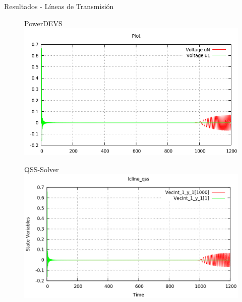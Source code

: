 \documentclass[10pt,presentation]{beamer}
\begin{document}
\begin{frame}{Resultados - Líneas de Transmisión}
\begin{figure}[H]
\begin{minipage}{0.5\textwidth}
\centering
PowerDEVS\\
\includegraphics[width=\linewidth]{lcline-pd}
\end{minipage}\hfill\begin{minipage}{0.5\textwidth}
\centering
QSS-Solver\\
 \includegraphics[width=\linewidth]{lcline-qss}
\end{minipage}
\end{figure}
\end{frame}
\end{document}
